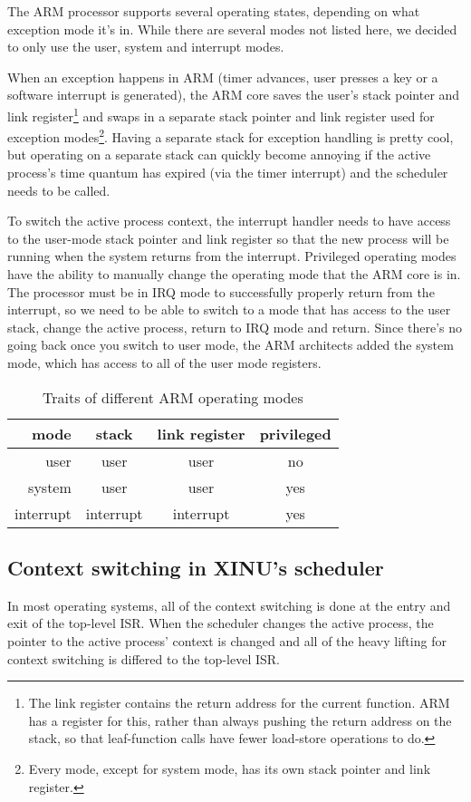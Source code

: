 \documentclass[12pt]{article}
\begin{document}
The ARM processor supports several operating states, depending on what
exception mode it's in. While there are several modes not listed here, we
decided to only use the user, system and interrupt modes.

When an exception happens in ARM (timer advances, user presses a key or a
software interrupt is generated), the ARM core saves the user's stack pointer
and link register\footnote{The link register contains the return address for
the current function. ARM has a register for this, rather than always pushing
the return address on the stack, so that leaf-function calls have fewer
load-store operations to do.} and swaps in a separate stack pointer and link
register used for exception modes\footnote{Every mode, except for system mode,
has its own stack pointer and link register.}. Having a separate stack for
exception handling is pretty cool, but operating on a separate stack can
quickly become annoying if the active process's time quantum has expired (via
the timer interrupt) and the scheduler needs to be called.

To switch the active process context, the interrupt handler needs to have
access to the user-mode stack pointer and link register so that the new process
will be running when the system returns from the interrupt.  Privileged
operating modes have the ability to manually change the operating mode that the
ARM core is in. The processor must be in IRQ mode to successfully properly
return from the interrupt, so we need to be able to switch to a mode that has
access to the user stack, change the active process, return to IRQ mode and
return. Since there's no going back once you switch to user mode, the ARM
architects added the system mode, which has access to all of the user mode
registers.

\begin{table}[h]
\caption{Traits of different ARM operating modes}
\label{arm-modes}
\center
\begin{tabular}{| r || c | c | c |}
\hline
mode & stack & link register & privileged \\\hline\hline
user & user & user & no \\\hline
system & user & user & yes \\\hline
interrupt & interrupt & interrupt & yes \\\hline
\end{tabular}
\end{table}

\subsection{Context switching in XINU's scheduler}
In most operating systems, all of the context switching is done at the entry
and exit of the top-level ISR. When the scheduler changes the active process,
the pointer to the active process' context is changed and all of the heavy
lifting for context switching is differed to the top-level ISR.
\end{document}
